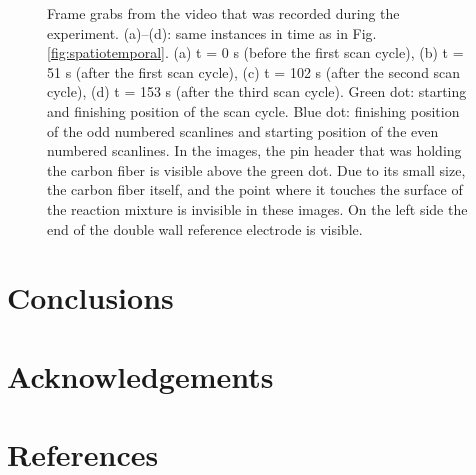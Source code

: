 \documentclass[3p, twocolumn]{elsarticle}
\begin{document}
\begin{figure}
\begin{tikzpicture}
\end{tikzpicture}
\caption{Frame grabs from the video that was recorded during the experiment.
(a)--(d): same instances in time as in Fig. \ref{fig:spatiotemporal}.
(a) t = 0 s (before the first scan cycle), (b) t = 51 s (after the first scan cycle), (c) t = 102 s (after the second scan cycle), (d) t = 153 s (after the third scan cycle).
Green dot: starting and finishing position of the scan cycle.
Blue dot: finishing position of the odd numbered scanlines and starting position of the even numbered scanlines.
In the images, the pin header that was holding the carbon fiber is visible above the green dot.
Due to its small size, the carbon fiber itself, and the point where it touches the surface of the reaction mixture is invisible in these images.
On the left side the end of the double wall reference electrode is visible.}
\label{fig:grabs}
\end{figure}



\section{Conclusions}

\section*{Acknowledgements}

\section*{References}
\end{document}
